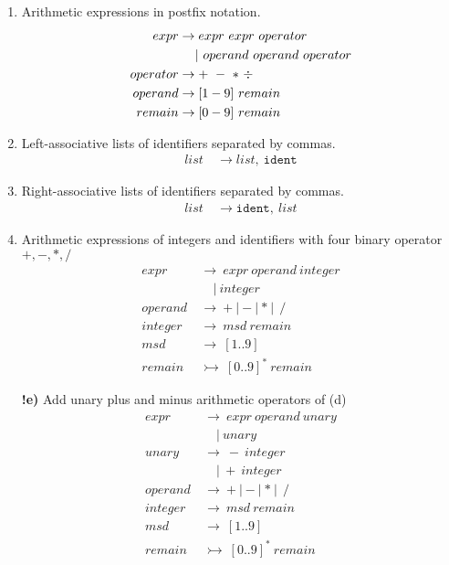 \documentclass{article}
\begin{document}
\begin{enumerate}[label=\textbf{\alph*)}]
	\item Arithmetic expressions in postfix notation.
	\begin{align*}
		expr &\rightarrow expr\ expr\ operator\\
			 &\hspace*{13pt}|\ operand\ operand\ operator\\
		operator &\rightarrow +\ -\ *\ \div\\
		operand &\rightarrow [1-9]\ remain\\
		remain &\rightarrow [0-9]\ remain\\
	\end{align*}

	\item Left-associative lists of identifiers separated by commas.
	\begin{align*}
		list\ &\rightarrow list,\ \mathtt{ident}
	\end{align*}
	
	\item Right-associative lists of identifiers separated by commas.
	\begin{align*}
		list\ &\rightarrow \mathtt{ident},\ list
	\end{align*}

	\item Arithmetic expressions of integers and identifiers with four binary operator $+, -, *, /$
	\begin{align*}
		expr\ &\rightarrow\ expr\ operand\ integer\\
			\ &\hspace{12pt}|\ integer\\
		operand\ &\rightarrow\ \mathtt{+}\ |\  \mathtt{-}\ |\ \mathtt{*}\ |\ \ \mathtt{/}\\
		integer\ &\rightarrow\ msd\  remain\\
		msd\ &\rightarrow\ [1..9]\\
		remain\ &\rightarrowtail\ [0..9]^*\ remain
	\end{align*}
\newpage
	\item[\textbf{!e)}] Add unary plus and minus arithmetic operators of (d)
	\begin{align*}
		expr\ &\rightarrow\ expr\ operand\ unary\\
		\ &\hspace{12pt}|\ unary\\
		unary &\rightarrow\ -\ integer\\
		&\hspace{12pt}|\ +\ integer\\
		operand\ &\rightarrow\ \mathtt{+}\ |\  \mathtt{-}\ |\ \mathtt{*}\ |\ \ \mathtt{/}\\
		integer\ &\rightarrow\ msd\  remain\\
		msd\ &\rightarrow\ [1..9]\\
		remain\ &\rightarrowtail\ [0..9]^*\ remain
	\end{align*}
\end{enumerate}
\end{document}
